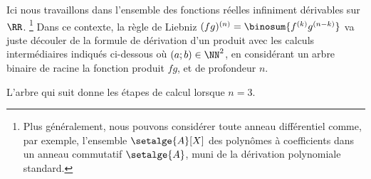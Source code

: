 Ici nous travaillons dans l'ensemble des fonctions réelles infiniment dérivables sur $\RR$.%
\footnote{
	Plus généralement, nous pouvons considérer toute anneau différentiel comme, par exemple, l'ensemble $\setalge{A}[X]$ des polynômes à coefficients dans un anneau commutatif $\setalge{A}$, muni de la dérivation polynomiale standard.
}
Dans ce contexte,
la règle de Liebniz $(fg)^{(n)} = \binosum{f^{(k)} g^{(n-k)}}$ va juste découler de la formule de dérivation d'un produit avec les calculs intermédiaires indiqués ci-dessous où $(a;b) \in \NN^2$, en considérant un arbre binaire de racine la fonction produit $f g$, et de profondeur $n$.

%
            {\intertree}{\prodder}


L'arbre qui suit donne les étapes de calcul lorsque $n=3$.

\binotree{\prodder}



